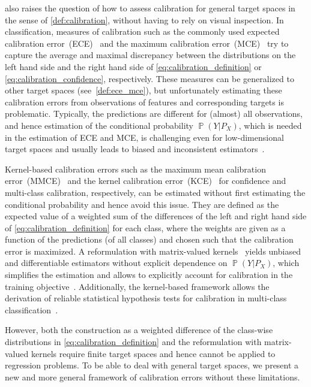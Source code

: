 \documentclass{article}
\DeclareMathOperator{\Prob}{\mathbb{P}}
\begin{document}
 also raises the question of how to assess
calibration for general target spaces in the sense of \cref{def:calibration},
without having to rely on visual inspection. In classification, measures of
calibration such as the commonly used expected calibration error~(ECE)~\citep{Naeini2015,Guo2017,Vaicenavicius2019,Kull2019}
and the maximum calibration error~(MCE)~\citep{Naeini2015} try to capture
the average and maximal discrepancy between the distributions on the
left hand side and the right hand side of \cref{eq:calibration_definition}
or \cref{eq:calibration_confidence}, respectively.
These measures can be generalized to other target spaces (see~\cref{def:ece_mce}),
but unfortunately estimating these calibration errors from observations
of features and corresponding targets is problematic. Typically, the
predictions are different for (almost) all observations, and hence
estimation of the conditional probability $\Prob{(Y|P_X)}$, which is 
needed in the estimation of ECE and MCE, is challenging even for low-dimensional
target spaces and usually leads to biased and inconsistent
estimators~\citep{Vaicenavicius2019}.

Kernel-based calibration errors such as the maximum mean calibration
error~(MMCE)~\citep{Kumar2018} and the kernel calibration
error~(KCE)~\citep{Widmann2019} for confidence and multi-class
calibration, respectively, can be estimated without first estimating
the conditional probability and hence avoid this issue. They are
defined as the expected value of a weighted sum of the differences of the
left and right hand side of \cref{eq:calibration_definition} for each
class, where the weights are given as a function of the predictions
(of all classes) and chosen such that the calibration error is maximized.
A reformulation with matrix-valued kernels~\citep{Widmann2019} yields
unbiased and differentiable estimators without explicit dependence on $\Prob(Y|P_X)$,
which simplifies the estimation and allows to explicitly account
for calibration in the training objective~\citep{Kumar2018}. Additionally, the
kernel-based framework allows the derivation of reliable statistical hypothesis
tests for calibration in multi-class classification~\citep{Widmann2019}.

However, both the construction as a weighted difference of the class-wise
distributions in \cref{eq:calibration_definition} and the reformulation with
matrix-valued kernels require finite target spaces and hence cannot be applied
to regression problems. To be able to deal with general target spaces, we present
a new and more general framework of calibration errors without these limitations.
\end{document}
